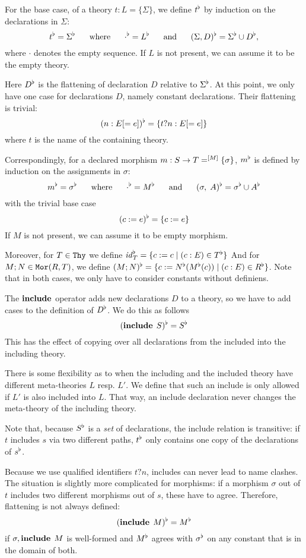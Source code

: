 \begin{definition}[Flattening]
For the base case, of a theory $t:L=\{\Sigma\}$, we define $\flt{t}$ by induction on the declarations in $\Sigma$:
\[\flt{t}=\flt{\Sigma} \tb\mwhere\tb \flt{\cdot}=\flt{L} \tb\mand\tb
 \flt{(\Sigma,D)}=\flt{\Sigma}\cup\fltd{\flt{\Sigma}}{D},\]
 where $\cdot$ denotes the empty sequence.
 If $L$ is not present, we can assume it to be the empty theory.
 
Here $\fltd{T}{D}$ is the flattening of declaration $D$ relative to $\flt{\Sigma}$.
At this point, we only have one case for declarations $D$, namely constant declarations.
Their flattening is trivial:
 \[\fltd{\Sigma}{(n:E[=e])}=\{t?n:E[=e]\}\]
where $t$ is the name of the containing theory.

Correspondingly, for a declared morphism $m:S\to T=^{\opt{M}}\{\sigma\}$, $\flt{m}$ is defined by induction on the assignments in $\sigma$:
\[\flt{m}=\flt{\sigma} \tb\mwhere\tb \flt{\cdot}=\flt{M} \tb\mand\tb\flt{(\sigma,\;A)}=\flt{\sigma}\cup\fltd{\flt{\sigma}}{A}\]
with the trivial base case
 \[\fltd{\sigma}{(c:=e)}=\{c:=e\}\]
If $M$ is not present, we can assume it to be empty morphism.
 
\begin{nomodexp}
Moreover, for $T\in\Thy$ we define $\flt{\id{T}}=\{c:=c \;|\; (c:E)\in\flt{T}\}$
And for $M;N\in\Mo{R}{T}$, we define $\flt{(M;N)}=\{c:=\flt{N}(\flt{M}(c)) \;|\; (c:E)\in\flt{R}\}$.
Note that in both cases, we only have to consider constants without definiens.
\end{nomodexp}
\end{definition}

\begin{example}\label{sem:incl}
The $\keyword{include}$ operator adds new declarations $D$ to a theory, so we have to add cases to the definition of $\fltd{\Sigma}{D}$.
We do this as follows
  \[\fltd{\Sigma}{(\icl{S})} = \flt{S}\]
This has the effect of copying over all declarations from the included into the including theory.

There is some flexibility as to when the including and the included theory have different meta-theories $L$ resp. $L'$.
We define that such an include is only allowed if $L'$ is also included into $L$.
That way, an include declaration never changes the meta-theory of the including theory.

Note that, because $\flt{S}$ is a \textit{set} of declarations, the include relation is transitive: if $t$ includes $s$ via two different paths, $\flt{t}$ only contains one copy of the declarations of $\flt{s}$.

Because we use qualified identifiers $t?n$, includes can never lead to name clashes.
The situation is slightly more complicated for morphisms: if a morphism $\sigma$ out of $t$ includes two different morphisms out of $s$, these have to agree.
Therefore, flattening is not always defined:
  \[\fltd{\sigma}{(\icl{M})} = \flt{M}\]
if $\sigma,\icl{M}$ is well-formed and $\flt{M}$ agrees with $\flt{\sigma}$ on any constant that is in the domain of both.
\end{example}

